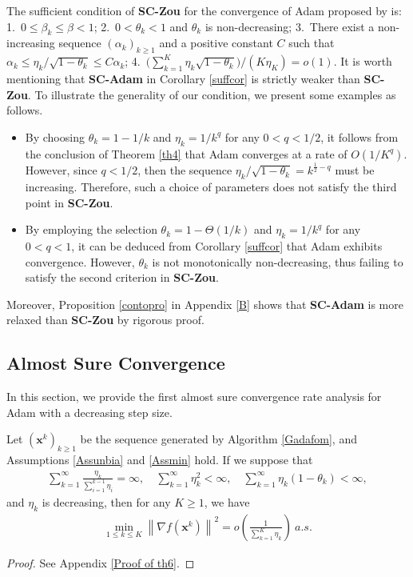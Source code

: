 \documentclass[twoside,11pt]{article}
\begin{document}
\par The sufficient condition of \textbf{SC-Zou} for the convergence of Adam proposed by \citet[Corollary 9]{zou2019sufficient} is: 1.\ $0\le\beta_k\le\beta<1$; 2.\ $0<\theta_k<1$ and $\theta_k$ is non-decreasing; 3.\ There exist a non-increasing sequence $(\alpha_k)_{k\ge 1}$ and a positive constant $C$ such that $\alpha_k\le\eta_k/\sqrt{1-\theta_k}\le C\alpha_k$; 4.\ $\big(\sum_{k=1}^{K}\eta_k\sqrt{1-\theta_k}\big)\big/\left( K\eta_{K}\right) =o(1)$. It is worth mentioning  that \textbf{SC-Adam} in Corollary \ref{suffcor} is strictly weaker than \textbf{SC-Zou}. To illustrate the generality of our condition, we present some examples as follows.
\begin{itemize}
\item By choosing $\theta_k=1-1/k$ and $\eta_k=1/{k^q}$ for any $0<q<1/2$, it follows from the conclusion of Theorem \ref{th4} that Adam converges at a rate of $	O(1/K^{q})$. However, since $q<1/2$, then the sequence  $\eta_k/\sqrt{1-\theta_k}=k^{\frac{1}{2}-q}$ must be increasing. Therefore, such a choice of parameters does not satisfy the third point in \textbf{SC-Zou}.
\item By employing the selection  $\theta_k=1-\Theta(1/k)$ and $\eta_k=1/k^{q}$ for any $0<q< 1$, it can be deduced from Corollary \ref{suffcor} that Adam exhibits convergence. However, $\theta_k$ is not monotonically non-decreasing, thus failing to satisfy the second criterion in \textbf{SC-Zou}.
\end{itemize}
\par Moreover, Proposition \ref{contopro} in Appendix \ref{B} shows that \textbf{SC-Adam} is more relaxed than \textbf{SC-Zou} by rigorous proof.

\subsection{Almost Sure Convergence}\label{Almost Sure Convergence}
In this section, we provide the first almost sure convergence rate analysis for Adam with a decreasing step size.

\begin{theorem}\label{th6}
Let $(\mathbf{x}^k)_{k\ge 1}$ be the sequence generated by Algorithm \ref{Gadafom}, and  Assumptions \ref{Assunbia} and \ref{Assmin} hold. If we suppose that
\begin{align}\label{th6.2}
	\sum_{k=1}^{\infty}\frac{\eta_k}{\sum_{i=1}^{k-1}\eta_i}=\infty,\quad\sum_{k=1}^{\infty}\eta_{k}^2<\infty,\quad\sum_{k=1}^{\infty}\eta_{k}(1-\theta_k)<\infty,
\end{align}
and $\eta_k$ is decreasing, then for any $K\ge 1$, we have
\begin{align}
	\min_{1\le k\le K}\left\|  \nabla f(\mathbf{x}^k)\right\|  ^2=o\left( \frac{1}{\sum_{k=1}^{K}\eta_{k}}\right) \ a.s. \nonumber
\end{align}
\end{theorem}
 \begin{proof}
See Appendix \ref{Proof of th6}.
 \end{proof}
\end{document}
